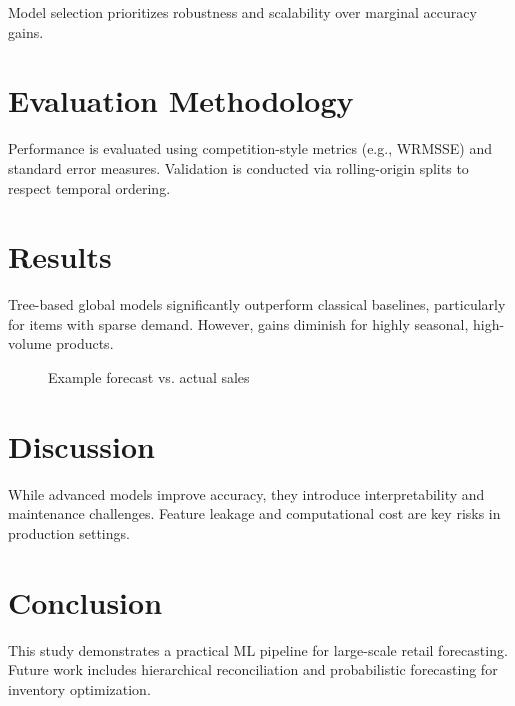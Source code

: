 \documentclass{article}
\begin{document}
Model selection prioritizes robustness and scalability over marginal accuracy gains.

\section{Evaluation Methodology}
Performance is evaluated using competition-style metrics (e.g., WRMSSE) and standard error measures.
Validation is conducted via rolling-origin splits to respect temporal ordering.

\section{Results}
Tree-based global models significantly outperform classical baselines, particularly for items with sparse demand.
However, gains diminish for highly seasonal, high-volume products.

\begin{figure}[h]
    \centering
    \caption{Example forecast vs. actual sales}
\end{figure}

\section{Discussion}
While advanced models improve accuracy, they introduce interpretability and maintenance challenges.
Feature leakage and computational cost are key risks in production settings.

\section{Conclusion}
This study demonstrates a practical ML pipeline for large-scale retail forecasting.
Future work includes hierarchical reconciliation and probabilistic forecasting for inventory optimization.



\end{document}
